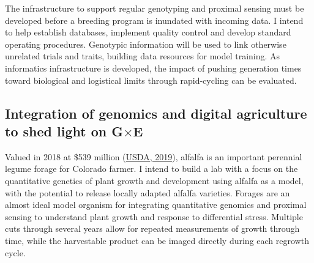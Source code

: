 \documentclass[11pt]{article}
\newcommand{\gxe}{G$\times$E}
\begin{document}


The infrastructure to support regular genotyping and proximal sensing must be developed before a breeding program is inundated with incoming data. I intend to help establish databases, implement quality control and develop standard operating procedures. Genotypic information will be used to link otherwise unrelated trials and traits, building data resources for model training. As informatics infrastructure is developed, the impact of pushing generation times toward biological and logistical limits through rapid-cycling can be evaluated. 

\subsection*{Integration of genomics and digital agriculture to shed light on \gxe}


Valued in 2018 at \$539 million (\href{https://www.nass.usda.gov/Quick_Stats/Ag_Overview/stateOverview.php?state=COLORADO}{USDA, 2019}), alfalfa is an important perennial legume forage for Colorado farmer. I intend to build a lab with a focus on the quantitative genetics of plant growth and development using alfalfa as a model, with the potential to release locally adapted alfalfa varieties. Forages are an almost ideal model organism for integrating quantitative genomics and proximal sensing to understand plant growth and response to differential stress. Multiple cuts through several years allow for repeated measurements of growth through time, while the harvestable product can be imaged directly during each regrowth cycle. 


\end{document}
